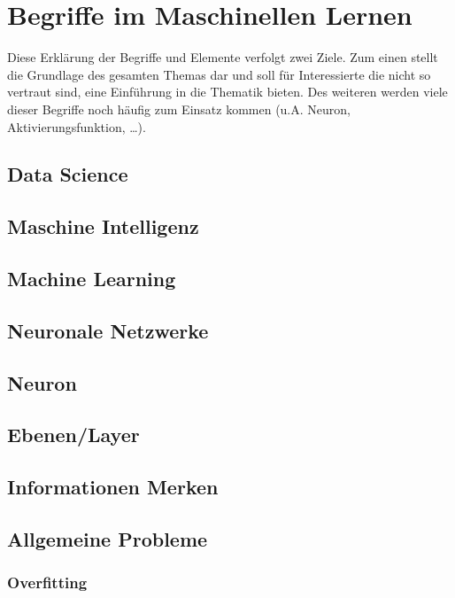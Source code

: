 \chapter{Begriffe im Maschinellen Lernen}
\label{cha:Begriffe}

Diese Erklärung der Begriffe und Elemente verfolgt zwei Ziele.
Zum einen stellt die Grundlage des gesamten Themas dar und soll für Interessierte die nicht so vertraut sind, eine Einführung in die Thematik bieten. Des weiteren werden viele dieser Begriffe noch häufig zum Einsatz kommen (u.A. Neuron, Aktivierungsfunktion, …).


\section{Data Science}



\section{Maschine Intelligenz}

\section{Machine Learning}

\section{Neuronale Netzwerke}

\section{Neuron}

\section{Ebenen/Layer}

\section{Informationen Merken}

\section{Allgemeine Probleme}

\subsection{Overfitting}

